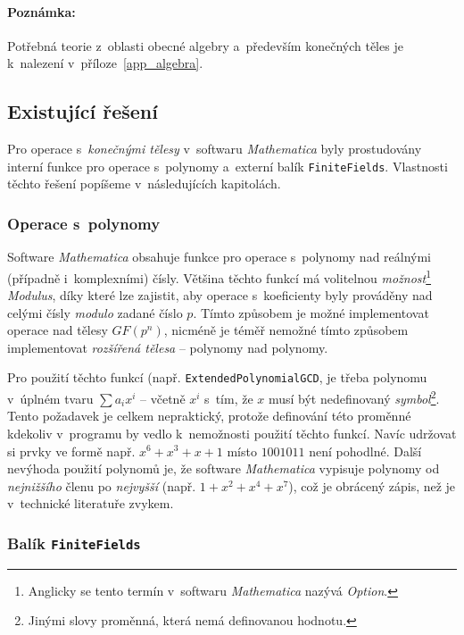 \documentclass[thesis=M,czech,hidelinks]{FITthesis}[2012/06/26]
\newcommand{\0}{{\textcolor[gray]{0.75}{0}}}
\begin{document}
\paragraph{Poznámka:} Potřebná teorie z~oblasti obecné algebry a~především
konečných těles je k~nalezení v~příloze~\ref{app_algebra}.

\subsection{Existující řešení}\label{kap_existujici_reseni}

Pro operace s~\emph{konečnými tělesy} v~softwaru \emph{Mathematica} byly
prostudovány interní funkce pro operace s~polynomy a~externí balík
\texttt{FiniteFields}. Vlastnosti těchto řešení popíšeme v~následujících
kapitolách.


\subsubsection{Operace s~polynomy}

Software \emph{Mathematica} obsahuje funkce pro operace s~polynomy nad reálnými
(případně i~komplexními) čísly. Většina těchto funkcí má volitelnou
\emph{možnost}\footnote{
    Anglicky se tento termín v~softwaru \emph{Mathematica} nazývá \emph{Option}.
} \emph{Modulus}, díky které lze zajistit, aby operace s~koeficienty byly
prováděny nad celými čísly \emph{modulo} zadané číslo $p$. Tímto způsobem je
možné implementovat operace nad tělesy $GF(p^n)$, nicméně je téměř nemožné tímto
způsobem implementovat \emph{rozšířená tělesa} -- polynomy nad polynomy.

Pro použití těchto funkcí (např. \texttt{ExtendedPolynomialGCD}, je třeba
polynomu v~úplném tvaru $\sum a_i x^i$ -- včetně $x^i$ s~tím, že $x$ musí být
nedefinovaný \emph{symbol}\footnote{
    Jinými slovy proměnná, která nemá definovanou hodnotu.
}. Tento požadavek je celkem nepraktický, protože definování této proměnné
kdekoliv v~programu by vedlo k~nemožnosti použití těchto funkcí. Navíc udržovat
si prvky ve formě např. $x^6 + x^3 + x + 1$ místo $1001011$ není pohodlné.
Další nevýhoda použití polynomů je, že software \emph{Mathematica} vypisuje
polynomy od \emph{nejnižšího} členu po \emph{nejvyšší} (např. $1+x^2+x^4+x^7$),
což je obrácený zápis, než je v~technické literatuře zvykem.


\subsubsection{Balík \texttt{FiniteFields}}
\end{document}
